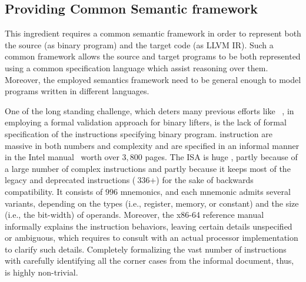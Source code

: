 \subsection{Providing Common Semantic framework} This ingredient requires a
common semantic framework in order to represent both the source (as \ISA binary
    program) and the target code (as LLVM IR). Such a common framework allows
the source and target programs to be both represented using a common
specification language which assist reasoning over them. Moreover, the employed
semantics framework need to be general enough to model programs written in
different languages.

One of the long standing challenge, which deters many previous efforts like
~\cite{ASE2017}, in employing a formal validation approach for binary
lifters, is the lack of formal specification of the \ISA instructions
specifying binary program. \ISA instruction are massive in both numbers and
complexity and are specified in an informal manner in the Intel
manual~\cite{IntelManual} worth over $3,800$ pages. The \ISA ISA is huge
, partly because of a large number of complex
  instructions and partly because it keeps most of the legacy and deprecated
  instructions ($~336$+) for the sake of backwards compatibility. It consists
  of $996$ mnemonics, and each mnemonic admits several variants, depending on
  the types (i.e., register, memory, or constant) and the size (i.e., the
      bit-width) of operands. Moreover, the x86-64 reference manual informally
  explains the instruction behaviors, leaving certain details unspecified or
  ambiguous, which requires  to consult with an actual processor implementation
  to clarify such details. Completely formalizing the vast number of
  instructions with carefully identifying all the corner cases from the
  informal document, thus, is highly non-trivial.

